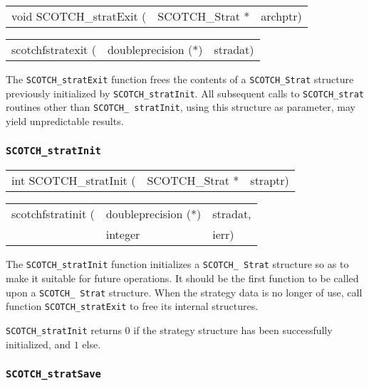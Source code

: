 \begin{itemize}
\progsyn

{\tt\begin{tabular}{l@{}ll}
void SCOTCH\_stratExit ( & SCOTCH\_Strat * & archptr)
\end{tabular}}

{\tt\begin{tabular}{l@{}ll}
scotchfstratexit ( & doubleprecision (*) & stradat)
\end{tabular}}

\progdes

The {\tt SCOTCH\_stratExit} function frees the contents of a
{\tt SCOTCH\_\lbt Strat} structure previously initialized by
{\tt SCOTCH\_\lbt strat\lbt Init}. All subsequent calls to
{\tt SCOTCH\_\lbt strat} routines other than {\tt SCOTCH\_\lbt
strat\lbt Init}, using this structure as parameter, may yield
unpredictable results.
\end{itemize}

\subsubsection{{\tt SCOTCH\_stratInit}}

\begin{itemize}
\progsyn

{\tt\begin{tabular}{l@{}ll}
int SCOTCH\_stratInit ( & SCOTCH\_Strat * & straptr)
\end{tabular}}

{\tt\begin{tabular}{l@{}ll}
scotchfstratinit ( & doubleprecision (*) & stradat, \\
                   & integer             & ierr)
\end{tabular}}

\progdes

The {\tt SCOTCH\_stratInit} function initializes a {\tt SCOTCH\_\lbt
Strat} structure so as to make it suitable for future operations. It
should be the first function to be called upon a {\tt SCOTCH\_\lbt
Strat} structure. When the strategy data is no longer of use, call
function {\tt SCOTCH\_\lbt strat\lbt Exit} to free its internal
structures.

\progret

{\tt SCOTCH\_stratInit} returns $0$ if the strategy structure has been
successfully initialized, and $1$ else.
\end{itemize}

\subsubsection{{\tt SCOTCH\_stratSave}}


